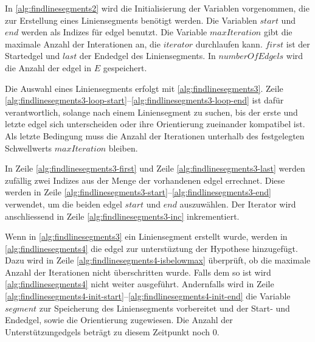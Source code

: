 In \autoref{alg:findlinesegments2} wird die Initialisierung der Variablen vorgenommen, die zur Erstellung eines
 Liniensegments benötigt werden. Die Variablen $\mathit{start}$ und $\mathit{end}$ werden als Indizes für \gls{edgel}
 benutzt. Die Variable $\mathit{maxIteration}$ gibt die maximale Anzahl der Interationen an, die $\mathit{iterator}$
 durchlaufen kann. $\mathit{first}$ ist der Startedgel und $\mathit{last}$ der Endedgel des Liniensegments. In
 $\mathit{numberOfEdgels}$ wird die Anzahl der \gls{edgel} in $E$ gespeichert.



Die Auswahl eines Liniensegments erfolgt mit \autoref{alg:findlinesegments3}. Zeile
 \ref{alg:findlinesegments3-loop-start}--\ref{alg:findlinesegments3-loop-end} ist dafür verantwortlich, solange nach
 einem Liniensegment zu suchen, bis der erste und letzte \gls{edgel} sich unterscheiden oder ihre Orientierung
 zueinander kompatibel ist. Als letzte Bedingung muss die Anzahl der Iterationen unterhalb des festgelegten
 Schwellwerts $\mathit{maxIteration}$ bleiben.



In Zeile \ref{alg:findlinesegments3-first} und Zeile \ref{alg:findlinesegments3-last} werden zufällig zwei Indizes aus
 der Menge der vorhandenen \gls{edgel} errechnet. Diese werden in Zeile
 \ref{alg:findlinesegments3-start}--\ref{alg:findlinesegments3-end} verwendet, um die beiden \gls{edgel}
 $\mathit{start}$ und $\mathit{end}$ auszuwählen. Der Iterator wird anschliessend in Zeile
 \ref{alg:findlinesegments3-inc} inkrementiert.

Wenn in \autoref{alg:findlinesegments3} ein Liniensegment erstellt wurde, werden in \autoref{alg:findlinesegments4} die
 \gls{edgel} zur unterstüztung der Hypothese hinzugefügt. Dazu wird in Zeile \ref{alg:findlinesegments4-isbelowmax}
 überprüft, ob die maximale Anzahl der Iterationen nicht überschritten wurde. Falls dem so ist wird
 \autoref{alg:findlinesegments4} nicht weiter ausgeführt. Andernfalls wird in Zeile
 \ref{alg:findlinesegments4-init-start}--\ref{alg:findlinesegments4-init-end} die Variable $\mathit{segment}$ zur
 Speicherung des Liniensegments vorbereitet und der Start- und Endedgel, sowie die Orientierung zugewiesen. Die Anzahl
 der Unterstützungedgels beträgt zu diesem Zeitpunkt noch $0$.



